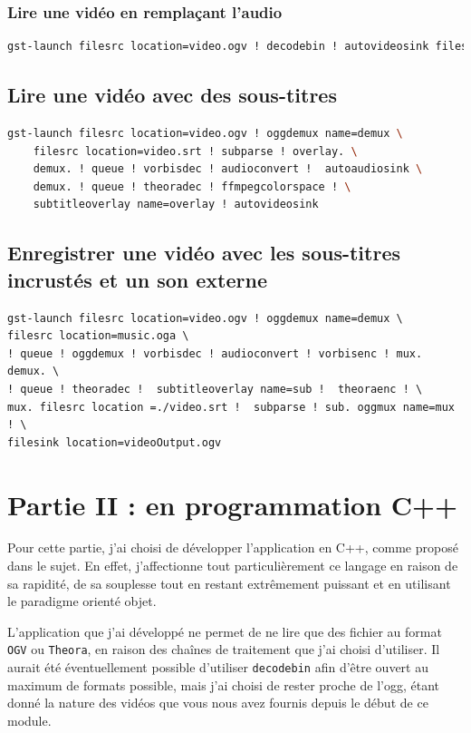 \documentclass[a4paper, 11pt]{article}
\begin{document}
	\subsubsection{Lire une vidéo en remplaçant l'audio}
	\begin{lstlisting}[language=sh, caption=Lire une vidéo avec le son de source différente]
gst-launch filesrc location=video.ogv ! decodebin ! autovideosink filesrc location=Thunderstruck.ogg ! decodebin ! autoaudiosink
	\end{lstlisting}
	\subsection{Lire une vidéo avec des sous-titres}
	\begin{lstlisting}[language=Bash, caption=Lire une vidéo avec des sous-titres \texttt{.srt}]	
gst-launch filesrc location=video.ogv ! oggdemux name=demux \ 
	filesrc location=video.srt ! subparse ! overlay. \
	demux. ! queue ! vorbisdec ! audioconvert !  autoaudiosink \
	demux. ! queue ! theoradec ! ffmpegcolorspace ! \
	subtitleoverlay name=overlay ! autovideosink
\end{lstlisting}
	\subsection{Enregistrer une vidéo avec les sous-titres incrustés et un son externe}
	\begin{lstlisting}[language=Sh, caption=Enregistrer une vidéo avec l'audio \texttt{music.oga}\, l'image \texttt{video.ogv} et les sous-titres]
gst-launch filesrc location=video.ogv ! oggdemux name=demux \
filesrc location=music.oga \
! queue ! oggdemux ! vorbisdec ! audioconvert ! vorbisenc ! mux. demux. \
! queue ! theoradec !  subtitleoverlay name=sub !  theoraenc ! \
mux. filesrc location =./video.srt !  subparse ! sub. oggmux name=mux ! \
filesink location=videoOutput.ogv
	\end{lstlisting}
	\section{Partie II : en programmation C++}
	Pour cette partie, j'ai choisi de développer l'application en C++, comme proposé dans le sujet. En effet, j'affectionne tout particulièrement ce langage en
	raison de sa rapidité, de sa souplesse tout en restant extrêmement puissant et en utilisant le paradigme orienté objet.

	L'application que j'ai développé ne permet de ne lire que des fichier au format \texttt{OGV} ou \texttt{Theora}, en raison des chaînes de traitement que j'ai
	choisi d'utiliser. Il aurait été éventuellement possible
	d'utiliser \texttt{decodebin} afin d'être ouvert au
	maximum de formats possible, mais j'ai choisi de rester
	proche de l'ogg, étant donné la nature des vidéos que vous
	nous avez fournis depuis le début de ce module.
\end{document}
